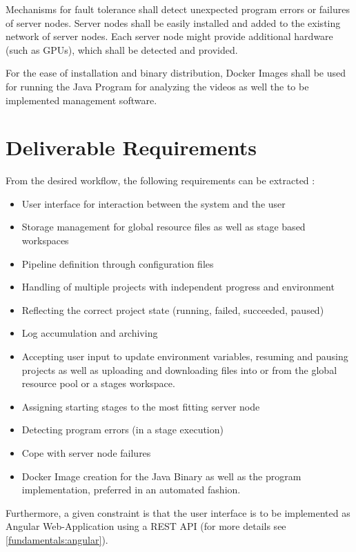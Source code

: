 Mechanisms for fault tolerance shall detect unexpected program errors or failures of server nodes.
Server nodes shall be easily installed and added to the existing network of server nodes.
Each server node might provide additional hardware (such as GPUs), which shall be detected and provided.

For the ease of installation and binary distribution, Docker Images shall be used for running the Java Program for analyzing the videos as well the to be implemented management software.





\section{Deliverable Requirements}

From the desired workflow, the following requirements can be extracted :

\begin{itemize}
	\item User interface for interaction between the system and the user
	\item Storage management for global resource files as well as stage based workspaces
	\item Pipeline definition through configuration files
	\item Handling of multiple projects with independent progress and environment
	\item Reflecting the correct project state (running, failed, succeeded, paused)
	\item Log accumulation and archiving
	\item Accepting user input to update environment variables, resuming and pausing projects as well as uploading and downloading files into or from the global resource pool or a stages workspace.
	\item Assigning starting stages to the most fitting server node
	\item Detecting program errors (in a stage execution)
	\item Cope with server node failures
	\item {} Docker Image creation for the Java Binary as well as the program implementation, preferred in an automated fashion.
\end{itemize}

Furthermore, a given constraint is that the user interface is to be implemented as Angular Web-Application using a REST API (for more details see \autoref{fundamentals:angular}).

